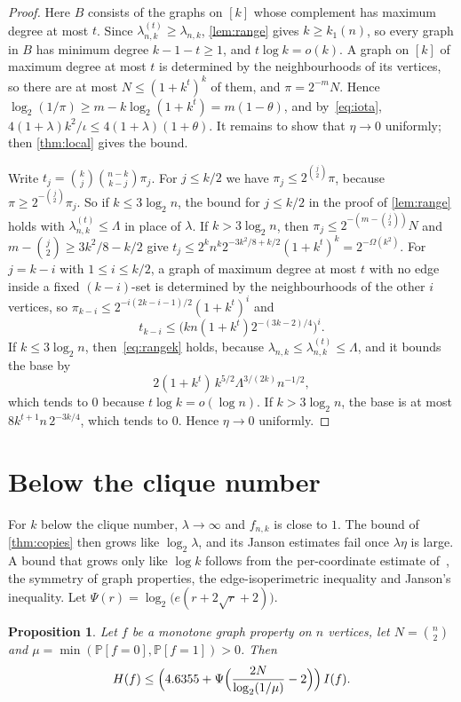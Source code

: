 \documentclass[11pt]{amsart}
\newtheorem{proposition}[theorem]{Proposition}
\theoremstyle{remark}
\renewcommand{\Pr}{\mathbb{P}}
\begin{document}
\begin{proof}
Here $B$ consists of the graphs on $[k]$ whose complement has maximum degree at most $t$. Since
$\lambda^{(t)}_{n,k}\ge\lambda_{n,k}$, \cref{lem:range} gives $k\ge k_1(n)$, so every graph in $B$ has minimum degree
$k-1-t\ge1$, and $t\log k=o(k)$. A graph on $[k]$ of maximum degree at most $t$ is determined by the neighbourhoods
of its vertices, so there are at most $N\le(1+k^t)^k$ of them, and $\pi=2^{-m}N$. Hence
$\log_2(1/\pi)\ge m-k\log_2(1+k^t)=m(1-\theta)$, and by~\eqref{eq:iota}, $4(1+\lambda)k^2/\iota\le4(1+\lambda)(1+\theta)$.
It remains to show that $\eta\to0$ uniformly; then \cref{thm:local} gives the bound.

Write $t_j=\binom kj\binom{n-k}{k-j}\pi_j$. For $j\le k/2$ we have $\pi_j\le2^{\binom j2}\pi$, because
$\pi\ge2^{-\binom j2}\pi_j$. So if $k\le3\log_2n$, the bound for $j\le k/2$ in the proof of \cref{lem:range} holds with
$\lambda^{(t)}_{n,k}\le\Lambda$ in place of $\lambda$. If $k>3\log_2n$, then $\pi_j\le2^{-(m-\binom j2)}N$ and
$m-\binom j2\ge3k^2/8-k/2$ give $t_j\le2^kn^k2^{-3k^2/8+k/2}(1+k^t)^k=2^{-\Omega(k^2)}$. For $j=k-i$ with $1\le i\le k/2$,
a graph of maximum degree at most $t$ with no edge inside a fixed $(k-i)$-set is determined by the neighbourhoods of the
other $i$ vertices, so $\pi_{k-i}\le2^{-i(2k-i-1)/2}(1+k^t)^i$ and
\[
t_{k-i}\le\bigl(kn(1+k^t)2^{-(3k-2)/4}\bigr)^i.
\]
If $k\le3\log_2n$, then~\eqref{eq:rangek} holds, because $\lambda_{n,k}\le\lambda^{(t)}_{n,k}\le\Lambda$, and it
bounds the base by
\[
2(1+k^t)\,k^{5/2}\Lambda^{3/(2k)}n^{-1/2},
\]
which tends to $0$ because $t\log k=o(\log n)$. If $k>3\log_2n$, the base is at most $8k^{t+1}n\,2^{-3k/4}$,
which tends to $0$. Hence $\eta\to0$ uniformly.
\end{proof}

\section{Below the clique number}\label{sec:below}

For $k$ below the clique number, $\lambda\to\infty$ and $f_{n,k}$ is close to $1$. The bound of \cref{thm:copies} then
grows like $\log_2\lambda$, and its Janson estimates fail once $\lambda\eta$ is large. A bound that grows only like
$\log k$ follows from the per-coordinate estimate of~\cite{Shm26b}, the symmetry of graph properties, the
edge-isoperimetric inequality and Janson's inequality. Let $\Psi(r)=\log_2\bigl(e(r+2\sqrt r+2)\bigr)$.

\begin{proposition}\label{prop:downset}
Let $f$ be a monotone graph property on $n$ vertices, let $N=\binom n2$ and $\mu=\min(\Pr[f=0],\Pr[f=1])>0$. Then
\[
H(f)\le\Bigl(4.6355+\Psi\Bigl(\frac{2N}{\log_2(1/\mu)}-2\Bigr)\Bigr)\,I(f).
\]
\end{proposition}
\end{document}
